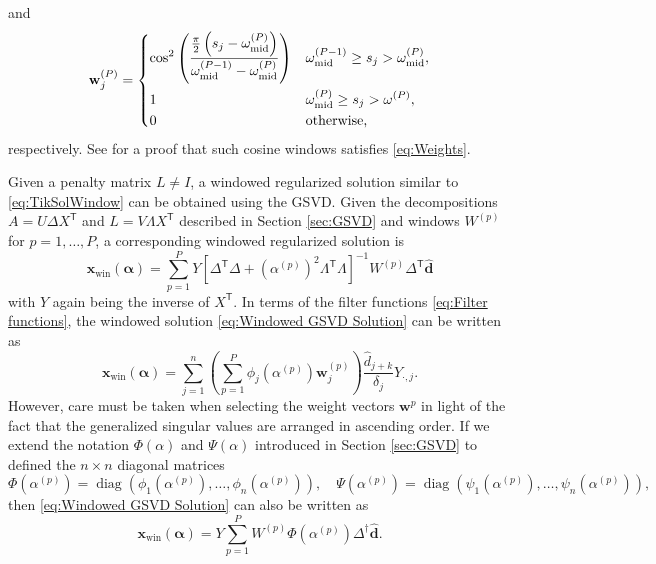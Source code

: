 \documentclass[12pt]{article}
\newcommand{\dVec}{\mathbf{d}}	%
\newcommand{\xVec}{\mathbf{x}}	%
\newcommand{\wVec}{\mathbf{w}}	%
\newcommand{\trans}[1]{{#1}^\mathsf{T}}	%
\newcommand{\inv}[1]{{#1}^{-1}}	%
\newcommand{\pinv}[1]{{#1}^\dagger}	%
\newcommand{\partition}{\omega}  %
\newcommand{\midpoint}{\partition_{\text{mid}}}   %
\DeclareMathOperator{\diag}{diag}	%
\newcommand{\dft}[1]{\widehat{#1}}	%
\newcommand{\regparam}{\alpha}  %
\newcommand{\regparamVec}{\bm{\regparam}}   %
\newcommand{\xWin}{\xVec_{\text{win}}}	%
\newcommand{\filt}{\phi}
\newcommand{\mfilt}{\psi}
\newcommand{\singular}{s}	%
\begin{document}
and
\begin{equation}
\label{eq:Last cosine window}
    \wVec_j^{(P)} = \begin{dcases}
    \cos^2\left(\frac{\frac{\pi}{2}\left(\singular_j - \midpoint^{(P)}\right)}{\midpoint^{(P-1)} - \midpoint^{(P)}}\right) & \midpoint^{(P-1)} \geq \singular_j > \midpoint^{(P)}, \\
    1 & \midpoint^{(P)} \geq \singular_j > \omega^{(P)}, \\
    0 & \text{otherwise,}
    \end{dcases}
\end{equation}
respectively. See \cite{Byrne} for a proof that such cosine windows satisfies \eqref{eq:Weights}. \par
Given a penalty matrix $L \neq I$, a windowed regularized solution similar to \eqref{eq:TikSolWindow} can be obtained using the GSVD. Given the decompositions $A = U\Delta\trans{X}$ and $L = V\Lambda\trans{X}$ described in Section \ref{sec:GSVD} and windows $W^{(p)}$ for $p = 1,\ldots,P$, a corresponding windowed regularized solution is
\begin{equation}
\label{eq:Windowed GSVD Solution}
    \xWin(\regparamVec) = \sum_{p=1}^P Y\inv{\left[\trans{\Delta}\Delta + \left(\regparam^{(p)}\right)^2 \trans{\Lambda}\Lambda\right]}W^{(p)}\trans{\Delta}\dft{\dVec}
\end{equation}
with $Y$ again being the inverse of $\trans{X}$. In terms of the filter functions \eqref{eq:Filter functions}, the windowed solution \eqref{eq:Windowed GSVD Solution} can be written as
\begin{equation}
\label{eq:Windowed GSVD Solution Sum}
    \xWin(\regparamVec) = \sum_{j=1}^n \left(\sum_{p=1}^P \filt_j\left(\regparam^{(p)}\right)\wVec^{(p)}_{j}\right)  \frac{\dft{d}_{j+k}}{\delta_j} Y_{\cdot,j}.
\end{equation}
However, care must be taken when selecting the weight vectors $\wVec^{p}$ in light of the fact that the generalized singular values are arranged in ascending order. If we extend the notation $\Phi(\regparam)$ and $\Psi(\regparam)$ introduced in Section \ref{sec:GSVD} to defined the $n \times n$ diagonal matrices 
\[\Phi\left(\regparam^{(p)}\right) = \diag\left(\filt_1\left(\regparam^{(p)}\right),\ldots,\filt_n\left(\regparam^{(p)}\right)\right), \quad  \Psi\left(\regparam^{(p)}\right) = \diag\left(\mfilt_1\left(\regparam^{(p)}\right),\ldots,\mfilt_n\left(\regparam^{(p)}\right)\right),\]
then \eqref{eq:Windowed GSVD Solution} can also be written as
\[\xWin(\regparamVec) = Y\sum_{p=1}^P W^{(p)} \Phi\left(\regparam^{(p)}\right)\pinv{\Delta}\dft{\dVec}.\]
\end{document}
